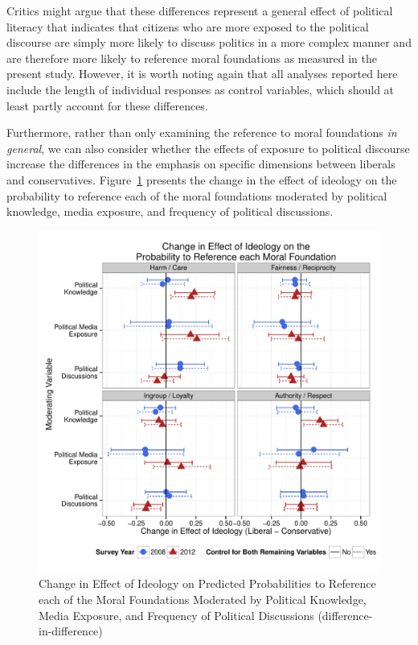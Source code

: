 \documentclass[12pt]{article}
\begin{document}
Critics might argue that these differences represent a general effect of political literacy that indicates that citizens who are more exposed to the political discourse are simply more likely to discuss politics in a more complex manner and are therefore more likely to reference moral foundations as measured in the present study. However, it is worth noting again that all analyses reported here include the length of individual responses as control variables, which should at least partly account for these differences.

Furthermore, rather than only examining the reference to moral foundations \textit{in general}, we can also consider whether the effects of exposure to political discourse increase the differences in the emphasis on specific dimensions between liberals and conservatives. Figure~\ref{fig:m3b_learn} presents the change in the effect of ideology on the probability to reference each of the moral foundations moderated by political knowledge, media exposure, and frequency of political discussions.

\begin{figure}\centering
\includegraphics[scale=.5]{../calc/fig/m3b_learn.pdf}
\caption{Change in Effect of Ideology on Predicted Probabilities to Reference each of the Moral Foundations Moderated by Political Knowledge, Media Exposure, and Frequency of Political Discussions (difference-in-difference)}\label{fig:m3b_learn}
\end{figure}
\end{document}
